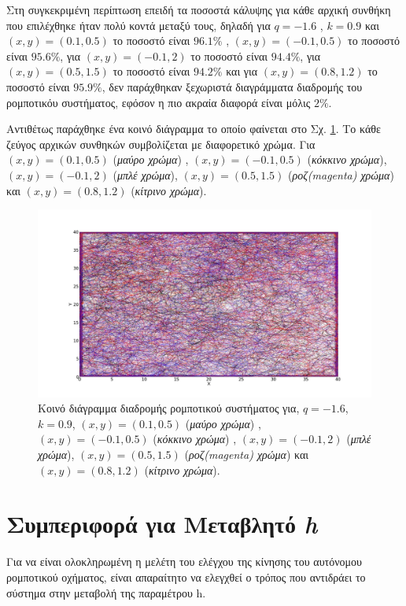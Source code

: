 Στη συγκεκριμένη περίπτωση επειδή τα ποσοστά κάλυψης για κάθε αρχική συνθήκη που επιλέχθηκε ήταν πολύ κοντά μεταξύ τους, δηλαδή  για $q =-1.6$ , $k = 0.9$ και $(x,y) = (0.1,0.5)$ το ποσοστό είναι $96.1\%$ , $(x,y) = (-0.1,0.5)$ το ποσοστό είναι $95.6\%$, για $(x,y) = (-0.1,2)$ το ποσοστό είναι $94.4\%$, για $(x,y) = (0.5,1.5)$ το ποσοστό είναι $94.2\%$ και για $(x,y) = (0.8,1.2)$ το ποσοστό είναι $95.9\%$, δεν παράχθηκαν ξεχωριστά διαγράμματα διαδρομής του ρομποτικόυ συστήματος, εφόσον η πιο ακραία διαφορά είναι μόλις $2\%$.

Αντιθέτως παράχθηκε ένα κοινό διάγραμμα το οποίο φαίνεται στο Σχ. \ref{f:g99}. Το κάθε ζεύγος αρχικών συνθηκών συμβολίζεται με διαφορετικό χρώμα. Για $(x,y) = (0.1,0.5)$ (\emph{μαύρο χρώμα}) , $(x,y) = (-0.1,0.5)$ (\emph{κόκκινο χρώμα}), $(x,y) = (-0.1,2)$ (\emph{μπλέ χρώμα}), $(x,y) = (0.5,1.5)$ (\emph{ροζ(magenta) χρώμα}) και $(x,y) = (0.8,1.2)$ (\emph{κίτρινο χρώμα}).

\begin{figure}[ht]
	\centering
	\includegraphics[width=1\linewidth]{LateX images/log/xy/g1}
	\caption{Κοινό διάγραμμα διαδρομής ρομποτικού συστήματος για, $q = -1.6$, $k = 0.9$, $(x,y) = (0.1,0.5)$ (\emph{μαύρο χρώμα}) , $(x,y) = (-0.1,0.5)$ (\emph{κόκκινο χρώμα}) , $(x,y) = (-0.1,2)$ (\emph{μπλέ χρώμα}), $(x,y) = (0.5,1.5)$ (\emph{ροζ(magenta) χρώμα}) και $(x,y) = (0.8,1.2)$ (\emph{κίτρινο χρώμα}).}
	\label{f:g99}	
\end{figure}

\clearpage


\section{Συμπεριφορά για Μεταβλητό \emph{h}}
\label{sec:g4}
Για να είναι ολοκληρωμένη η μελέτη του ελέγχου της κίνησης του αυτόνομου ρομποτικού οχήματος, είναι απαραίτητο να ελεγχθεί ο τρόπος που αντιδράει το σύστημα στην μεταβολή της παραμέτρου h.

